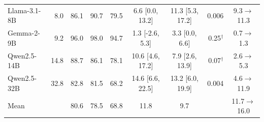 \begin{table}[H]
{\begin{tabular}{@{}lrrrrccrc@{}}
Llama-3.1-8B & 8.0 & 86.1 & 90.7 & 79.5 & 6.6 {\scriptsize[0.0, 13.2]} & 11.3 {\scriptsize[5.3, 17.2]} & 0.006 & 9.3$\to$11.3 \\
Gemma-2-9B & 9.2 & 96.0 & 98.0 & 94.7 & 1.3 {\scriptsize[-2.6, 5.3]} & 3.3 {\scriptsize[0.0, 6.6]} & 0.25$^{\dagger}$ & 0.7$\to$1.3 \\
Qwen2.5-14B & 14.8 & 88.7 & 86.1 & 78.1 & 10.6 {\scriptsize[4.6, 17.2]} & 7.9 {\scriptsize[2.6, 13.9]} & 0.07$^{\dagger}$ & 2.6$\to$5.3 \\
Qwen2.5-32B & 32.8 & 82.8 & 81.5 & 68.2 & 14.6 {\scriptsize[6.6, 22.5]} & 13.2 {\scriptsize[6.0, 19.9]} & 0.004 & 4.6$\to$11.9 \\
\midrule
Mean &  & 80.6 & 78.5 & 68.8 & 11.8 & 9.7 &  & 11.7$\to$16.0 \\
\bottomrule
\end{tabular}}
\end{table}
